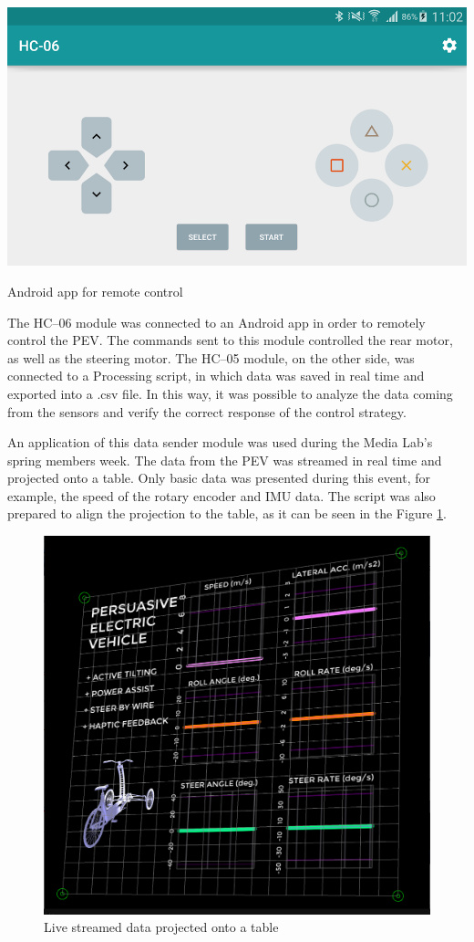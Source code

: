 \begin{marginfigure}[5cm]
	\includegraphics[width=1.1\linewidth]{figs/05/android}
	\caption{Android app for remote control}
\end{marginfigure}
The HC--06 module was connected to an Android app in order to remotely control the PEV. The commands sent to this module controlled the rear motor, as well as the steering motor. The HC--05 module, on the other side, was connected to a Processing script, in which data was saved in real time and exported into a .csv file. In this way, it was possible to analyze the data coming from the sensors and verify the correct response of the control strategy.

An application of this data sender module was used during the Media Lab's spring members week. The data from the PEV was streamed in real time and projected onto a table. Only basic data was presented during this event, for example, the speed of the rotary encoder and IMU data. The script was also prepared to align the projection to the table, as it can be seen in the Figure \ref{Captura3}.
\begin{figure}[h!]
	\includegraphics[width=1\linewidth]{figs/05/Captura3}
	\caption{Live streamed data projected onto a table}
	\label{Captura3}
\end{figure}

